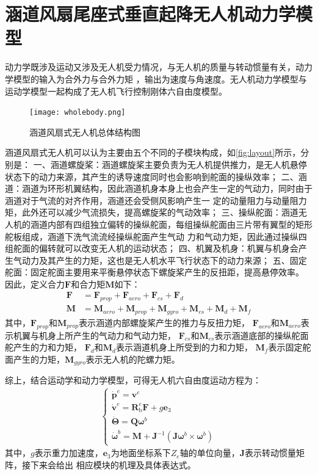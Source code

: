 \section{涵道风扇尾座式垂直起降无人机动力学模型}
动力学既涉及运动又涉及无人机受力情况，与无人机的质量与转动惯量有关，动力学模型的输入为合外力与合外力矩
，输出为速度与角速度。无人机动力学模型与运动学模型一起构成了无人机飞行控制刚体六自由度模型。
\begin{figure}[htbp]
    \centering
    \texttt{[image: wholebody.png]}
    \caption{\label{fig:layout}涵道风扇式无人机总体结构图}
\end{figure}

涵道风扇式无人机可以认为主要由五个不同的子模块构成，如\autoref{fig:layout}所示，分别是：
一、涵道螺旋桨：涵道螺旋桨主要负责为无人机提供推力，是无人机悬停状态下的动力来源，其产生的诱导速度同时也会影响到舵面的操纵效率；
二、涵道：涵道为环形机翼结构，因此涵道机身本身上也会产生一定的气动力，同时由于涵道对于气流的对齐作用，涵道还会受侧风影响产生一
定的动量阻力与动量阻力矩，此外还可以减少气流损失，提高螺旋桨的气动效率；
三、操纵舵面：涵道无人机的涵道内部有四组独立偏转的操纵舵面，每组操纵舵面由三片带有翼型的矩形舵板组成，涵道下洗气流流经操纵舵面产生气动
力和气动力矩，因此通过操纵四组舵面的偏转就可以改变无人机的运动状态；
四、机翼及机身：机翼与机身会产生气动力及其产生的力矩，这也是无人机水平飞行状态下的动力来源；
五、固定舵面：固定舵面主要用来平衡悬停状态下螺旋桨产生的反扭距，提高悬停效率。
因此，定义合力$\mathbf{F}$和合力矩$\mathbf{M}$如下：
\begin{align}
    \mathbf{F} & =\mathbf{F}_{prop}+\mathbf{F}_{aero}+\mathbf{F}_{cs}+\mathbf{F}_{d}\\
    \mathbf{M} & =\mathbf{M}_{aero}+\mathbf{M}_{prop}+\mathbf{M}_{gyro}+\mathbf{M}_{cs}+\mathbf{M}_{d}+\mathbf{M}_{f}
\end{align}
其中，$\mathbf{F}_{prop}$和$\mathbf{M}_{prop}$表示涵道内部螺旋桨产生的推力与反扭力矩，
$\mathbf{F}_{aero}$和$\mathbf{M}_{aero}$表示机翼与机身上所产生的气动力和气动力矩，
$\mathbf{F}_{cs}$和$\mathbf{M}_{cs}$表示涵道底部的操纵舵面舵产生的力和力矩，
$\mathbf{F}_{d}$和$\mathbf{M}_{d}$表示涵道机身上所受到的力和力矩，
$\mathbf{M}_{f}$表示固定舵面产生的力矩，$\mathbf{M}_{gyro}$表示无人机的陀螺力矩。

综上，结合运动学和动力学模型，可得无人机六自由度运动方程为：
\begin{align}
\left\{\begin{array}{l}
    \dot{\mathbf{p}}^{e}=\mathbf{v}^{e} \\
    \dot{\mathbf{v}}^{e}=\mathbf{R}_{\mathrm{b}}^{e} \mathbf{F}+g\mathbf{e}_{3} \\
    \dot{\mathbf{\Theta}}=\mathbf{Q} {\mathbf{\omega}}^{b} \\
    \dot{\mathbf{\omega}}^{b}=\mathbf{M}+\mathbf{J}^{-1}\left(\mathbf{J} {\mathbf{\omega}}^{b} \times {\mathbf{\omega}}^{b}\right)
    \end{array}\right.
\end{align}
其中，$g$表示重力加速度，$\mathbf{e}_{3}$为地面坐标系下$Z_{e}$轴的单位向量，$\mathbf{J}$表示转动惯量矩阵，接下来会给出
相应模块的机理及具体表达式。
